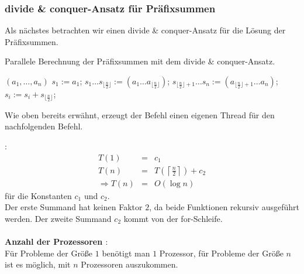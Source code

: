 \pagebreak
\subsubsection{divide \& conquer-Ansatz für Präfixsummen}
Als nächstes betrachten wir einen divide \& conquer-Ansatz für die Lösung der Präfixsummen.
\begin{algorithm}[h!]
\caption{Parallele Berechnung der Präfixsummen mit dem divide \& conquer-Ansatz.}
\begin{algorithmic}
$(a_1, \dots, a_n)$
\STATE $s_1:=a_1$;
\ELSE
\STATE $s_1 \dots s_{\lfloor\frac{n}{2}\rfloor}:=$$(a_1 \dots a_{\lfloor\frac{n}{2}\rfloor})$;
\STATE $s_{\lfloor\frac{n}{2}\rfloor+1} \dots s_{n}:=$$(a_{\lfloor\frac{n}{2}\rfloor +1} \dots a_{n})$;
\ENDIF
{}
\STATE $s_i:=s_i + s_{\lfloor\frac{n}{2}\rfloor}$;
\ENDFOR
\end{algorithmic}
\end{algorithm}

\noindent Wie oben bereits erw\"{a}hnt, erzeugt der Befehl \algspawn einen eigenen Thread für den nachfolgenden Befehl.

:
\begin{eqnarray*}
T(1) & = & c_1 \\
T(n) & = & T\left(\left\lceil\frac{n}{2}\right\rceil\right)+c_2 \\
\Rightarrow T(n) & = & O(\log n)
\end{eqnarray*} für die Konstanten $c_1$ und $c_2$.\\
Der erste Summand hat keinen Faktor $2$, da beide Funktionen rekursiv ausgeführt werden.
Der zweite Summand $c_2$ kommt von der for-Schleife.
\\\\{\bf{Anzahl der Prozessoren }}:\\
Für Probleme der Größe $1$ benötigt man $1$ Prozessor, f\"{u}r Probleme der Gr\"{o}\ss{}e $n$ ist es 
m\"{o}glich, mit $n$ Prozessoren auszukommen.

